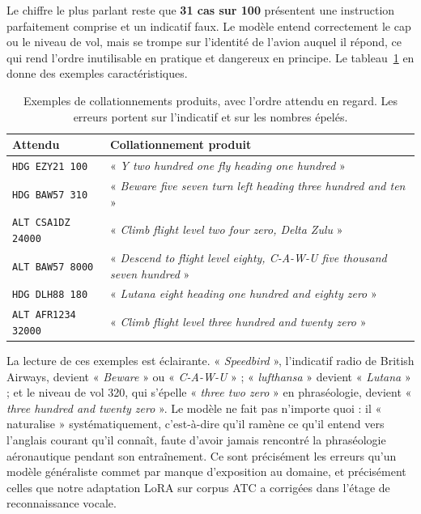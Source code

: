 \documentclass[11pt,a4paper]{article}
\begin{document}
Le chiffre le plus parlant reste que \textbf{31 cas sur 100} présentent une
instruction parfaitement comprise et un indicatif faux. Le modèle entend correctement le cap
ou le niveau de vol, mais se trompe sur l'identité de l'avion auquel il répond,
ce qui rend l'ordre inutilisable en pratique et dangereux en principe. Le
tableau~\ref{tab:indicatifs} en donne des exemples caractéristiques.

\begin{table}[h]
\centering
\caption{Exemples de collationnements produits, avec l'ordre attendu en regard.
Les erreurs portent sur l'indicatif et sur les nombres épelés.}
\label{tab:indicatifs}
\small
\begin{tabular}{@{}ll@{}}
\toprule
\textbf{Attendu} & \textbf{Collationnement produit}\\
\midrule
\texttt{HDG EZY21 100}   & « \emph{Y two hundred one fly heading one hundred} »\\
\texttt{HDG BAW57 310}   & « \emph{Beware five seven turn left heading three hundred and ten} »\\
\texttt{ALT CSA1DZ 24000}& « \emph{Climb flight level two four zero, Delta Zulu} »\\
\texttt{ALT BAW57 8000}  & « \emph{Descend to flight level eighty, C-A-W-U five thousand seven hundred} »\\
\texttt{HDG DLH88 180}   & « \emph{Lutana eight heading one hundred and eighty zero} »\\
\texttt{ALT AFR1234 32000}& « \emph{Climb flight level three hundred and twenty zero} »\\
\bottomrule
\end{tabular}
\end{table}

La lecture de ces exemples est éclairante. « \emph{Speedbird} », l'indicatif
radio de British Airways, devient « \emph{Beware} » ou « \emph{C-A-W-U} » ;
« \emph{lufthansa} » devient « \emph{Lutana} » ; et le niveau de vol 320,
qui s'épelle « \emph{three two zero} » en phraséologie, devient « \emph{three
hundred and twenty zero} ». Le modèle ne fait pas n'importe quoi : il
« naturalise » systématiquement, c'est-à-dire qu'il ramène ce qu'il entend vers
l'anglais courant qu'il connaît, faute d'avoir jamais rencontré la phraséologie
aéronautique pendant son entraînement. Ce sont précisément les erreurs qu'un
modèle généraliste commet par manque d'exposition au domaine, et précisément
celles que notre adaptation LoRA sur corpus ATC a corrigées dans l'étage de
reconnaissance vocale.
\end{document}
